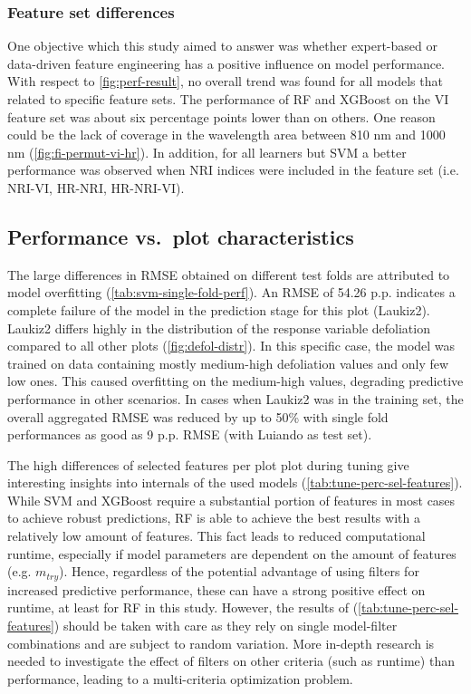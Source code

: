 \documentclass[letterpaper, peerreview, draftcls]{IEEEtran}
\begin{document}
\subsubsection{Feature set differences}
One objective which this study aimed to answer was whether expert-based or data-driven feature engineering has a positive influence on model performance.
With respect to \autoref{fig:perf-result}, no overall trend was found for all models that related to specific feature sets.
The performance of RF and XGBoost on the VI feature set was about six percentage points lower than on others.
One reason could be the lack of coverage in the wavelength area between 810 nm and 1000 nm (\autoref{fig:fi-permut-vi-hr}).
In addition, for all learners but SVM a better performance was observed when NRI indices were included in the feature set (i.e. NRI-VI, HR-NRI, HR-NRI-VI).

\subsection{Performance vs.\ plot characteristics}
\label{subsec:perf-plot-char}
The large differences in RMSE obtained on different test folds are attributed to model overfitting (\autoref{tab:svm-single-fold-perf}).
An RMSE of 54.26 p.p. indicates a complete failure of the model in the prediction stage for this plot (Laukiz2).
Laukiz2 differs highly in the distribution of the response variable defoliation compared to all other plots (\autoref{fig:defol-distr}).
In this specific case, the model was trained on data containing mostly medium-high defoliation values and only few low ones.
This caused overfitting on the medium-high values, degrading predictive performance in other scenarios.
In cases when Laukiz2 was in the training set, the overall aggregated RMSE was reduced by up to 50\% with single fold performances as good as 9 p.p. RMSE (with Luiando as test set).

The high differences of selected features per plot plot during tuning give interesting insights into internals of the used models (\autoref{tab:tune-perc-sel-features}).
While SVM and XGBoost require a substantial portion of features in most cases to achieve robust predictions, RF is able to achieve the best results with a relatively low amount of features.
This fact leads to reduced computational runtime, especially if model parameters are dependent on the amount of features (e.g. \texttt{\(m_{try}\)}).
Hence, regardless of the potential advantage of using filters for increased predictive performance, these can have a strong positive effect on runtime, at least for RF in this study.
However, the results of (\autoref{tab:tune-perc-sel-features}) should be taken with care as they rely on single model-filter combinations and are subject to random variation.
More in-depth research is needed to investigate the effect of filters on other criteria (such as runtime) than performance, leading to a multi-criteria optimization problem.
\end{document}
